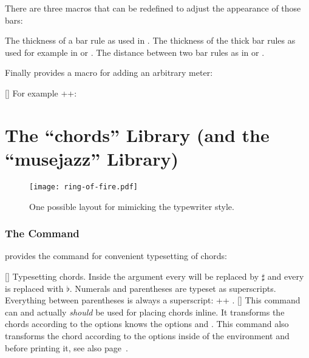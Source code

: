 \documentclass[load-preamble+]{cnltx-doc}
\def\library*#1{``#1''}%
\begin{document}
There are three macros that can be redefined to adjust the appearance of those
bars:
\begin{commands}
  \Default{.02em}
    The thickness of a bar rule as used in .
  \Default{.15em}
    The thickness of the thick bar rules as used for example in
     or .
  \Default{.1em}
    The distance between two bar rules as in  or .
\end{commands}

Finally \musicsymbols{} provides a macro for adding an arbitrary meter:
\begin{commands}
  []
    For example \verbcode++: 
\end{commands}

\clearpage
\part{The \library*{chords} Library (and the \library*{musejazz}
  Library)}\label{part:chords-library}

\begin{figure}
  \centering
  \texttt{[image: ring-of-fire.pdf]}
  \caption{One possible layout for \leadsheets{} mimicking the typewriter
    style.}
  \label{fig:leadsheet}
\end{figure}

\section{The  Command}

\chords{} provides the command  for convenient
typesetting of chords:

\begin{example}
   
   
\end{example}

\begin{commands}
  []
    Typesetting chords.  Inside the argument every \code{\#} will be replaced
    by $\sharp$ and every  is replaced with $\flat$.  Numerals and
    parentheses are typeset as superscripts.  Everything between parentheses
    is always a superscript: \verbcode++
    .
  []
    This command can and actually \emph{should} be used for placing chords
    inline. It transforms the chords according to the options knows the
    options  and .  This
    command also transforms the chord according to the options inside of the
     environment  and  before
    printing it, see also page~\pageref{cs:writechord}.
\end{commands}
\end{document}
